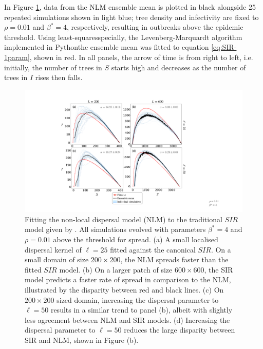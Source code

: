 In Figure \ref{fig:SIR-fitting}, data from the NLM ensemble mean is plotted in black alongside 25 repeated simulations shown in light blue; 
tree density and infectivity are fixed to $\rho=0.01$ and $\beta^*=4$, respectively, resulting in outbreaks above the epidemic threshold.
Using least-squares\textemdash specially, the Levenberg-Marquardt algorithm \cite{more1978levenberg} implemented in Python\textemdash the ensemble mean was fitted to equation \ref{eq:SIR-1param}, shown in red.
In all panels, the arrow of time is from right to left, i.e. initially, the number of trees in $S$ starts high and decreases as the number of trees in $I$ rises then falls.
 
 \begin{figure}
    \centering
    \includegraphics[scale=0.425]{chapter5/figures/fig2-sir-fitting-step.pdf}
    \caption{Fitting the non-local dispersal model (NLM) to the traditional $SIR$ model given by \cite{kermack-model}. All simulations evolved with parameters $\beta^{*}=4$ and $\rho=0.01$ above the threshold for spread. (a) A small localised dispersal kernel of $\ell=25$ fitted against the canonical $SIR$. On a small domain of size $200\times 200$, the NLM spreads faster than the fitted $SIR$ model. (b) On a larger patch of size $600\times 600$, the SIR model predicts a faster rate of spread in comparison to the NLM, illustrated by the disparity between red and black lines. (c) On $200\times 200$ sized domain, increasing the dispersal parameter to $\ell=50$ results in a similar trend to panel (b), albeit with slightly less agreement between NLM and SIR models. (d) Increasing the dispersal parameter to $\ell=50$ reduces the large disparity between SIR and NLM, shown in Figure (b).}
    \label{fig:SIR-fitting}
\end{figure}

